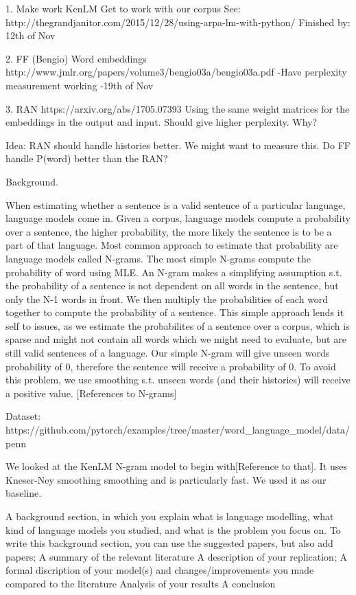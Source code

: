 
1. Make  work KenLM
Get to work with our corpus
See: http://thegrandjanitor.com/2015/12/28/using-arpa-lm-with-python/
Finished by: 12th of Nov

2. FF (Bengio)
Word embeddings
http://www.jmlr.org/papers/volume3/bengio03a/bengio03a.pdf
-Have perplexity measurement working
-19th of Nov

3. RAN
https://arxiv.org/abs/1705.07393
Using the same weight matrices for the embeddings in the output and input. Should give higher perplexity. Why?

Idea:
RAN should handle histories better. We might want to measure this.
Do FF handle P(word) better than the RAN?

Background.

When estimating whether a sentence is a valid sentence of a particular language, language models come in.
Given a corpus, language models compute a probability over a sentence, the higher probability, the more likely the sentence is to be a part of that language. Most common approach to estimate that probability are language models called N-grams. The most simple N-grams compute the probability of word using MLE. An N-gram makes a simplifying assumption s.t. the probability of a sentence is not dependent on all words in the sentence, but only the N-1 words in front. We then multiply the probabilities of each word together to compute the probability of a sentence. This simple approach lends it self to issues, as we estimate the probabilites of a sentence over a corpus, which is sparse and might not contain all words which we might need to evaluate, but are still valid sentences of a language. Our simple N-gram will give unseen words probability of 0, therefore the sentence will receive a probability of 0. To avoid this problem, we use smoothing s.t. unseen words (and their histories) will receive a positive value. [References to N-grams]

Dataset: https://github.com/pytorch/examples/tree/master/word_language_model/data/penn

We looked at the KenLM N-gram model to begin with[Reference to that]. It uses Kneser-Ney smoothing smoothing and is particularly fast. We used it as our baseline.

A background section, in which you explain what is language modelling, what kind of language models you studied, and what is the problem you focus on. To write this background section, you can use the suggested papers, but also add papers;
A summary of the relevant literature
A description of your replication;
A formal discription of your model(s) and changes/improvements you made compared to the literature
Analysis of your results
A conclusion



